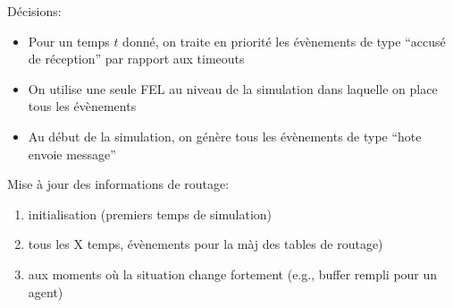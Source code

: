 \documentclass[a4paper,11pt]{report}
\begin{document}

\tableofcontents %
\pagebreak
\listoffigures %
\pagebreak

Décisions:
\begin{itemize}
 \item Pour un temps $t$ donné, on traite en priorité les évènements de type ``accusé de réception'' par rapport aux timeouts 
 \item On utilise une seule FEL au niveau de la simulation dans laquelle on place tous les évènements
 \item Au début de la simulation, on génère tous les évènements de type ``hote envoie message''
\end{itemize}


Mise à jour des informations de routage:
\begin{enumerate}
 \item initialisation (premiers temps de simulation)
 \item tous les X temps, évènements pour la màj des tables de routage)
 \item aux moments où la situation change fortement (e.g., buffer rempli pour un agent)
\end{enumerate}

\clearpage
\end{document}
